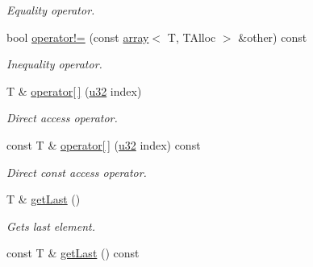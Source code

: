 \begin{DoxyCompactItemize}
\begin{DoxyCompactList}\small\item\em Equality operator. \end{DoxyCompactList}\item 
bool \hyperlink{classirr_1_1core_1_1array_a20f435e8fabd821b66ef34227c1fceae}{operator!=} (const \hyperlink{classirr_1_1core_1_1array}{array}$<$ T, T\+Alloc $>$ \&other) const \hypertarget{classirr_1_1core_1_1array_a20f435e8fabd821b66ef34227c1fceae}{}\label{classirr_1_1core_1_1array_a20f435e8fabd821b66ef34227c1fceae}

\begin{DoxyCompactList}\small\item\em Inequality operator. \end{DoxyCompactList}\item 
T \& \hyperlink{classirr_1_1core_1_1array_a1e09dc5cc93e88fd3a37cad011b3b531}{operator\mbox{[}$\,$\mbox{]}} (\hyperlink{namespaceirr_a0416a53257075833e7002efd0a18e804}{u32} index)\hypertarget{classirr_1_1core_1_1array_a1e09dc5cc93e88fd3a37cad011b3b531}{}\label{classirr_1_1core_1_1array_a1e09dc5cc93e88fd3a37cad011b3b531}

\begin{DoxyCompactList}\small\item\em Direct access operator. \end{DoxyCompactList}\item 
const T \& \hyperlink{classirr_1_1core_1_1array_a432981694ff74f416764bfbf71c76b4c}{operator\mbox{[}$\,$\mbox{]}} (\hyperlink{namespaceirr_a0416a53257075833e7002efd0a18e804}{u32} index) const \hypertarget{classirr_1_1core_1_1array_a432981694ff74f416764bfbf71c76b4c}{}\label{classirr_1_1core_1_1array_a432981694ff74f416764bfbf71c76b4c}

\begin{DoxyCompactList}\small\item\em Direct const access operator. \end{DoxyCompactList}\item 
T \& \hyperlink{classirr_1_1core_1_1array_ad87dc5db8bf6ec1033c945a0d3724e09}{get\+Last} ()\hypertarget{classirr_1_1core_1_1array_ad87dc5db8bf6ec1033c945a0d3724e09}{}\label{classirr_1_1core_1_1array_ad87dc5db8bf6ec1033c945a0d3724e09}

\begin{DoxyCompactList}\small\item\em Gets last element. \end{DoxyCompactList}\item 
const T \& \hyperlink{classirr_1_1core_1_1array_ad531932175e210c17429878411490932}{get\+Last} () const \hypertarget{classirr_1_1core_1_1array_ad531932175e210c17429878411490932}{}\label{classirr_1_1core_1_1array_ad531932175e210c17429878411490932}


\end{DoxyCompactItemize}
